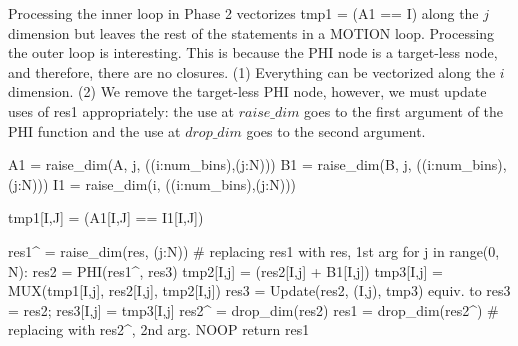 Processing the inner loop in Phase 2 vectorizes {\sf tmp1 = (A1 == I)} along the $j$ dimension but leaves the rest of the statements in a MOTION loop. Processing the outer loop is interesting. This is because the PHI node is a target-less node, and therefore, there are no closures. (1) Everything can be vectorized along the $i$ dimension. (2) We remove the target-less PHI node, however, we must update uses of {\sf res1} appropriately: the use at $\mathit{raise\_dim}$ goes to the first argument of the PHI function and the use at $\mathit{drop\_dim}$ goes to the second argument.

{\small
\begin{pythonn}
A1 = raise_dim(A, j, ((i:num_bins),(j:N)))
B1 = raise_dim(B, j, ((i:num_bins),(j:N)))
I1 = raise_dim(i, ((i:num_bins),(j:N)))

tmp1[I,J] = (A1[I,J] == I1[I,J])

res1^ = raise_dim(res, (j:N)) # replacing res1 with res, 1st arg
for j in range(0, N):
   res2 = PHI(res1^, res3)
   tmp2[I,j] = (res2[I,j] + B1[I,j])
   tmp3[I,j] = MUX(tmp1[I,j], res2[I,j], tmp2[I,j])
   res3 = Update(res2, (I,j), tmp3)
   equiv. to res3 = res2; res3[I,j] = tmp3[I,j]
res2^ = drop_dim(res2)
res1 = drop_dim(res2^) # replacing with res2^, 2nd arg. NOOP
return res1
\end{pythonn}
}

